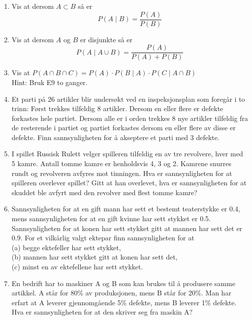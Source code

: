 \begin{enumerate}
\item  Vis at dersom $A\subset B$ så er
\[   P(A \mid B)=\frac{P(A)}{P(B)}  \]

\item   Vis at dersom $A$ og $B$ er disjunkte så er
\[   P(A \mid A \cup B)=\frac{P(A)}{P(A)+P(B)}  \]

\item  Vis at $P(A\cap B\cap C) = 
       P(A)\cdot P(B\mid A)\cdot P(C\mid A\cap B)$ \\
     Hint: Bruk E9 to ganger.

\item  Et parti på 26 artikler blir undersøkt ved en
     inspeksjonsplan som foregår i to trinn: Først trekkes
     tilfeldig 8 artikler. Dersom en eller flere er defekte
     forkastes hele partiet. Dersom alle er i orden trekkes 8 nye
     artikler tilfeldig fra de resterende i partiet og partiet
     forkastes dersom en eller flere av disse er defekte. Finn
     sannsynligheten for å akseptere et parti med 3 defekte.

\item  I spillet Russisk Rulett velger spilleren tilfeldig en av
     tre revolvere, hver med 5 kamre. Antall tomme kamre er
     henholdsvis 4, 3 og 2. Kamrene snurres rundt og revolveren
     avfyres mot tinningen. Hva er sannsynligheten for at
     spilleren overlever spillet? Gitt at han overlevet, hva er
     sannsynligheten for at skuddet ble avfyrt med den revolver
     med flest tomme kamre?

\item  Sannsynligheten for at en gift mann har sett et bestemt
     teaterstykke er 0.4, mens sannsynligheten for at en gift
     kvinne har sett stykket er 0.5. Sannsynligheten for at konen
     har sett stykket gitt at mannen har sett det er 0.9.
     For et vilkårlig valgt ektepar finn sannsynligheten for at \\
     (a)  begge ektefeller har sett stykket,\\
     (b)  mannen har sett stykket gitt at konen har sett det,\\
     (c)  minst en av ektefellene har sett stykket.
                
\item  En bedrift har to maskiner A og B som kan brukes til å
     produsere samme artikkel. A står for 80\% av produksjonen,
     mens B står for 20\%. Man har erfart at A leverer
     gjennomgående 5\% defekte, mens B leverer 1\% defekte. Hva er
     sannsynligheten for at den skriver seg fra maskin A?


\end{enumerate}
